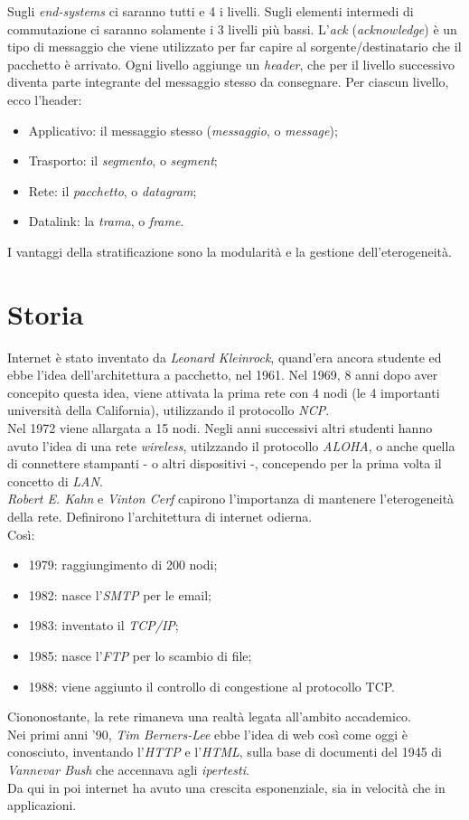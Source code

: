 Sugli \textit{end-systems} ci saranno tutti e 4 i livelli.
Sugli elementi intermedi di commutazione ci saranno solamente i 3 livelli più bassi.
L'\textit{ack} (\textit{acknowledge}) è un tipo di messaggio che viene utilizzato per far capire al sorgente/destinatario che il pacchetto è arrivato.
Ogni livello aggiunge un \textit{header}, che per il livello successivo diventa parte integrante del messaggio stesso da consegnare. Per ciascun livello, ecco l'header:
\begin{itemize}
    \item Applicativo: il messaggio stesso (\textit{messaggio}, o \textit{message});
    \item Trasporto: il \textit{segmento}, o \textit{segment};
    \item Rete: il \textit{pacchetto}, o \textit{datagram};
    \item Datalink: la \textit{trama}, o \textit{frame}.
\end{itemize}
I vantaggi della stratificazione sono la modularità e la gestione dell'eterogeneità.

\section{Storia}
Internet è stato inventato da \textit{Leonard Kleinrock}, quand'era ancora studente ed ebbe l'idea dell'architettura a pacchetto, nel 1961.
Nel 1969, 8 anni dopo aver concepito questa idea, viene attivata la prima rete con 4 nodi (le 4 importanti università della California), utilizzando il protocollo \textit{NCP}.
\\
Nel 1972 viene allargata a 15 nodi.
Negli anni successivi altri studenti hanno avuto l'idea di una rete \textit{wireless}, utilzzando il protocollo \textit{ALOHA}, o anche quella di connettere stampanti - o altri dispositivi -, concependo per la prima volta il concetto di \textit{LAN}.
\\
\textit{Robert E. Kahn} e \textit{Vinton Cerf} capirono l'importanza di mantenere l'eterogeneità della rete. Definirono l'architettura di internet odierna.
\\
Così:
\begin{itemize}
    \item 1979: raggiungimento di 200 nodi;
    \item 1982: nasce l'\textit{SMTP} per le email;
    \item 1983: inventato il \textit{TCP/IP};
    \item 1985: nasce l'\textit{FTP} per lo scambio di file;
    \item 1988: viene aggiunto il controllo di congestione al protocollo TCP.
\end{itemize}
Ciononostante, la rete rimaneva una realtà legata all'ambito accademico.
\\
Nei primi anni '90, \textit{Tim Berners-Lee} ebbe l'idea di web così come oggi è conosciuto, inventando l'\textit{HTTP} e l'\textit{HTML}, sulla base di documenti del 1945 di \textit{Vannevar Bush} che accennava agli \textit{ipertesti}.
\\
Da qui in poi internet ha avuto una crescita esponenziale, sia in velocità che in applicazioni.
